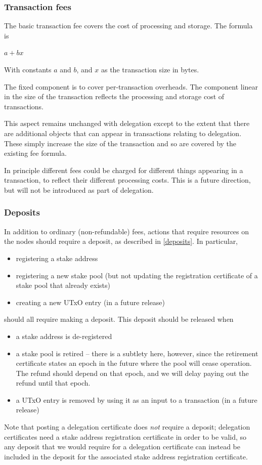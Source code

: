 \documentclass[11pt,a4paper,dvipsnames,twosided]{article}
\begin{document}
\subsubsection{Transaction fees}
\label{transaction-fees}

The basic transaction fee covers the cost of processing and storage. The
formula is

\(a + b x\)

With constants \(a\) and \(b\), and \(x\) as the transaction size in
bytes.

The fixed component is to cover per-transaction overheads. The component
linear in the size of the transaction reflects the processing and
storage cost of transactions.

This aspect remains unchanged with delegation except to the extent that
there are additional objects that can appear in transactions relating to
delegation. These simply increase the size of the transaction and so are
covered by the existing fee formula.

In principle different fees could be charged for different things
appearing in a transaction, to reflect their different processing costs.
This is a future direction, but will not be introduced as part of
delegation.

\subsubsection{Deposits}
\label{fees-deposits}

In addition to ordinary (non-refundable) fees, actions that require
resources on the nodes should require a deposit, as described in
\cref{deposits}. In particular,
\begin{itemize}
\item registering a stake address
\item registering a new stake pool (but not updating the registration
  certificate of a stake pool that already exists)
\item creating a new UTxO entry (in a future release)
\end{itemize}
should all require making a deposit. This deposit should be released
when
\begin{itemize}
\item a stake address is de-registered
\item a stake pool is retired -- there is a subtlety here, however,
  since the retirement certificate states an epoch in the future where
  the pool will cease operation. The refund should depend on that
  epoch, and we will delay paying out the refund until that epoch.
\item a UTxO entry is removed by using it as an input to a transaction (in a
  future release)
\end{itemize}
Note that posting a delegation certificate does \emph{not} require a
deposit; delegation certificates need a stake address registration
certificate in order to be valid, so any deposit that we would require
for a delegation certificate can instead be included in the deposit
for the associated stake address registration certificate.
\end{document}
